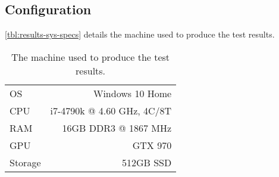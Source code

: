 \subsection{Configuration}

\autoref{tbl:results-sys-specs} details the machine used to produce the test results.

\begin{table}[H] 
    \centering
    \begin{tabular}{l|r}
        \toprule

        OS & Windows 10 Home \\
        CPU & i7-4790k @ 4.60 GHz, 4C/8T \\
        RAM & 16GB DDR3 @ 1867 MHz \\
        GPU & GTX 970 \\
        Storage & 512GB SSD \\

        \bottomrule
    \end{tabular}
    \caption{The machine used to produce the test results.}
    \label{tbl:results-sys-specs}
\end{table}